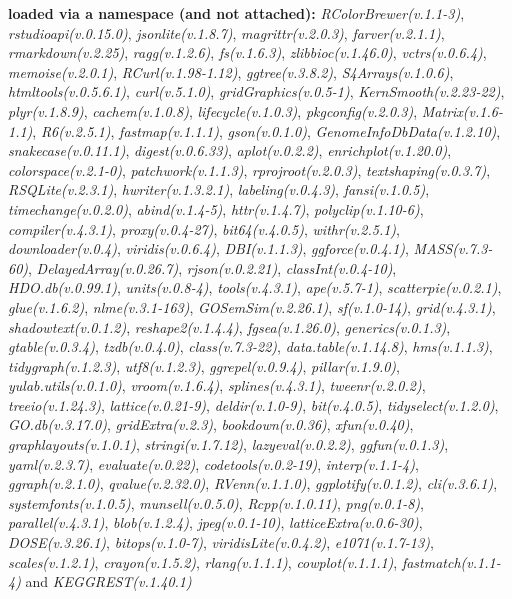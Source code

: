 \documentclass[
]{book}
\begin{document}
\textbf{loaded via a namespace (and not attached):}
\emph{RColorBrewer(v.1.1-3)}, \emph{rstudioapi(v.0.15.0)}, \emph{jsonlite(v.1.8.7)}, \emph{magrittr(v.2.0.3)}, \emph{farver(v.2.1.1)}, \emph{rmarkdown(v.2.25)}, \emph{ragg(v.1.2.6)}, \emph{fs(v.1.6.3)}, \emph{zlibbioc(v.1.46.0)}, \emph{vctrs(v.0.6.4)}, \emph{memoise(v.2.0.1)}, \emph{RCurl(v.1.98-1.12)}, \emph{ggtree(v.3.8.2)}, \emph{S4Arrays(v.1.0.6)}, \emph{htmltools(v.0.5.6.1)}, \emph{curl(v.5.1.0)}, \emph{gridGraphics(v.0.5-1)}, \emph{KernSmooth(v.2.23-22)}, \emph{plyr(v.1.8.9)}, \emph{cachem(v.1.0.8)}, \emph{lifecycle(v.1.0.3)}, \emph{pkgconfig(v.2.0.3)}, \emph{Matrix(v.1.6-1.1)}, \emph{R6(v.2.5.1)}, \emph{fastmap(v.1.1.1)}, \emph{gson(v.0.1.0)}, \emph{GenomeInfoDbData(v.1.2.10)}, \emph{snakecase(v.0.11.1)}, \emph{digest(v.0.6.33)}, \emph{aplot(v.0.2.2)}, \emph{enrichplot(v.1.20.0)}, \emph{colorspace(v.2.1-0)}, \emph{patchwork(v.1.1.3)}, \emph{rprojroot(v.2.0.3)}, \emph{textshaping(v.0.3.7)}, \emph{RSQLite(v.2.3.1)}, \emph{hwriter(v.1.3.2.1)}, \emph{labeling(v.0.4.3)}, \emph{fansi(v.1.0.5)}, \emph{timechange(v.0.2.0)}, \emph{abind(v.1.4-5)}, \emph{httr(v.1.4.7)}, \emph{polyclip(v.1.10-6)}, \emph{compiler(v.4.3.1)}, \emph{proxy(v.0.4-27)}, \emph{bit64(v.4.0.5)}, \emph{withr(v.2.5.1)}, \emph{downloader(v.0.4)}, \emph{viridis(v.0.6.4)}, \emph{DBI(v.1.1.3)}, \emph{ggforce(v.0.4.1)}, \emph{MASS(v.7.3-60)}, \emph{DelayedArray(v.0.26.7)}, \emph{rjson(v.0.2.21)}, \emph{classInt(v.0.4-10)}, \emph{HDO.db(v.0.99.1)}, \emph{units(v.0.8-4)}, \emph{tools(v.4.3.1)}, \emph{ape(v.5.7-1)}, \emph{scatterpie(v.0.2.1)}, \emph{glue(v.1.6.2)}, \emph{nlme(v.3.1-163)}, \emph{GOSemSim(v.2.26.1)}, \emph{sf(v.1.0-14)}, \emph{grid(v.4.3.1)}, \emph{shadowtext(v.0.1.2)}, \emph{reshape2(v.1.4.4)}, \emph{fgsea(v.1.26.0)}, \emph{generics(v.0.1.3)}, \emph{gtable(v.0.3.4)}, \emph{tzdb(v.0.4.0)}, \emph{class(v.7.3-22)}, \emph{data.table(v.1.14.8)}, \emph{hms(v.1.1.3)}, \emph{tidygraph(v.1.2.3)}, \emph{utf8(v.1.2.3)}, \emph{ggrepel(v.0.9.4)}, \emph{pillar(v.1.9.0)}, \emph{yulab.utils(v.0.1.0)}, \emph{vroom(v.1.6.4)}, \emph{splines(v.4.3.1)}, \emph{tweenr(v.2.0.2)}, \emph{treeio(v.1.24.3)}, \emph{lattice(v.0.21-9)}, \emph{deldir(v.1.0-9)}, \emph{bit(v.4.0.5)}, \emph{tidyselect(v.1.2.0)}, \emph{GO.db(v.3.17.0)}, \emph{gridExtra(v.2.3)}, \emph{bookdown(v.0.36)}, \emph{xfun(v.0.40)}, \emph{graphlayouts(v.1.0.1)}, \emph{stringi(v.1.7.12)}, \emph{lazyeval(v.0.2.2)}, \emph{ggfun(v.0.1.3)}, \emph{yaml(v.2.3.7)}, \emph{evaluate(v.0.22)}, \emph{codetools(v.0.2-19)}, \emph{interp(v.1.1-4)}, \emph{ggraph(v.2.1.0)}, \emph{qvalue(v.2.32.0)}, \emph{RVenn(v.1.1.0)}, \emph{ggplotify(v.0.1.2)}, \emph{cli(v.3.6.1)}, \emph{systemfonts(v.1.0.5)}, \emph{munsell(v.0.5.0)}, \emph{Rcpp(v.1.0.11)}, \emph{png(v.0.1-8)}, \emph{parallel(v.4.3.1)}, \emph{blob(v.1.2.4)}, \emph{jpeg(v.0.1-10)}, \emph{latticeExtra(v.0.6-30)}, \emph{DOSE(v.3.26.1)}, \emph{bitops(v.1.0-7)}, \emph{viridisLite(v.0.4.2)}, \emph{e1071(v.1.7-13)}, \emph{scales(v.1.2.1)}, \emph{crayon(v.1.5.2)}, \emph{rlang(v.1.1.1)}, \emph{cowplot(v.1.1.1)}, \emph{fastmatch(v.1.1-4)} and \emph{KEGGREST(v.1.40.1)}
\end{document}
